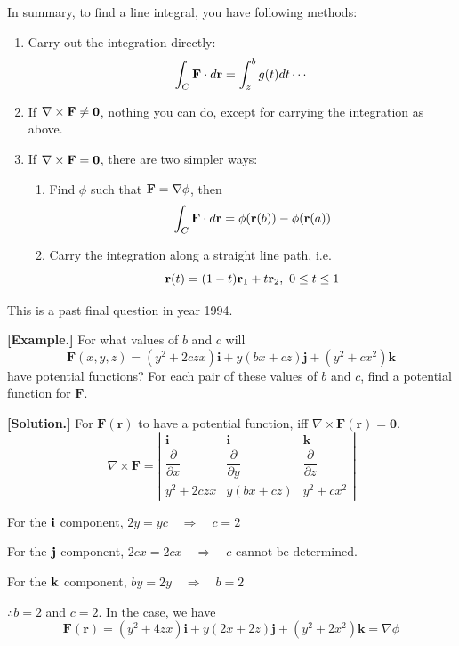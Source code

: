 \documentclass[11pt, a4paper]{MATH2023}
\newcommand{\eg}{\textbf{[Example.] }}
\newcommand{\sol}{\textbf{[Solution.] }}
\newcommand{\ii}{{\bf i}}
\newcommand{\jj}{{\bf j}}
\newcommand{\kk}{{\bf k}}
\newcommand{\rr}{{\bf r}}
\newcommand{\FF}{{\bf F}}
\begin{document}
\begin{spacing}{1.3}
    \newpage
    {\blue In summary, to find a line integral, you have following methods:}
    \begin{enumerate}
        \item Carry out the integration directly: 
        $$\int_C \FF\cdot d\rr=\int_z^b g(t) dt\cdots$$
        \item If $\nabla \times \FF \ne {\bf 0}$, nothing you can do, except for 
        carrying the integration as above.
        \item If $\nabla \times \FF = {\bf 0}$, there are two simpler ways:
        \begin{enumerate}
            \item Find $\phi$ such that $\FF =\nabla \phi$, then 
            $$\int_C \FF \cdot d\rr=\phi (\rr(b))-\phi (\rr(a))$$
            \item Carry the integration along a straight line path, i.e. 
            $$\rr(t)=(1-t)\rr_1+t\rr_2,\ 0\le t\le 1$$
        \end{enumerate}
    \end{enumerate}

    \newpage
    {\blue This is a past final question in year 1994.}

    \eg For what values of $b$ and $c$ will
    $$\mathbf{F}(x, y, z)=\left(y^{2}+2 c z x\right) \mathbf{i}+y(b x+c z) \mathbf{j}+\left(y^{2}+c x^{2}\right) \mathbf{k}$$
    have potential functions? For each pair of these values of $b$ and $c$, find a potential function for $\mathbf{F}$.

    \sol 
    For $\mathbf{F}(\mathbf{r})$ to have a potential function, iff $\nabla \times \mathbf{F}(\mathbf{r})=\mathbf{0}$.
    $$\nabla \times \mathbf{F}=\left|\begin{array}{ccc}
        \mathbf{i} & \mathbf{i} & \mathbf{k} \\
        \dfrac{\partial}{\partial x} & \dfrac{\partial}{\partial y} & \dfrac{\partial}{\partial z} \\
        y^{2}+2 c z x & y(b x+c z) & y^{2}+c x^{2}
    \end{array}\right|$$

    For the $\ii$ component, $2 y=y c \quad \Rightarrow \quad c=2$

    For the $\jj$ component, $2 c x=2 c x \quad \Rightarrow \quad c \text { cannot be determined. }$
    
    For the $\kk$ component, $b y=2 y \quad \Rightarrow \quad b=2$

    $\therefore b=2$ and $c=2 .$ In the case, we have
    $$\mathbf{F}(\mathbf{r})=\left(y^{2}+4 z x\right) \mathbf{i}+y(2 x+2 z) \mathbf{j}+\left(y^{2}+2 x^{2}\right) \mathbf{k}=\nabla \phi$$
    

\end{spacing}
\end{document}
